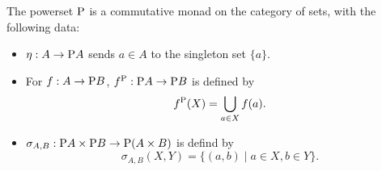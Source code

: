 \documentclass[DynamicalBook]{subfiles}
\begin{document}
\begin{proposition}\label{prop.powerset_commutative_monad}
  The powerset $\mathrm{P}$ is a commutative monad on the category of sets, with
  the following data:
  \begin{itemize}
   \item $\eta : A \to \mathrm{P} A$ sends $a \in A$ to the singleton set $\{a\}$.
   \item For $f : A \to \mathrm{P} B$, $f^{\mathrm{P}} : \mathrm{P} A \to \mathrm{P} B$ is
     defined by
     $$f^{\mathrm{P}}(X) = \bigcup_{a \in X} f(a).$$
   \item $\sigma_{A, B} : \mathrm{P} A \times \mathrm{P} B \to \mathrm{P} (A \times B)$
     is defind by
     $$\sigma_{A, B}(X, Y) = \{(a, b) \mid a \in X, b \in Y\}.$$
  \end{itemize}
\end{proposition}
\end{document}
